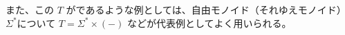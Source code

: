 \documentclass[
		head_space=20mm,
		foot_space=20mm,
		gutter=10mm,
		line_length=190mm
]{jlreq}
\begin{document}
\begin{example}[モノイドによる計算効果]
\begin{center}
\begin{footnotesize}
		\end{footnotesize}
	\end{center}\vspace{6pt}
	また、この $T$ がであるような例としては、自由モノイド（それゆえモノイド）$\Sigma^\ast$について $T=\Sigma^\ast\times(-)$ などが代表例としてよく用いられる。
\end{example}


\clearpage
\end{document}
